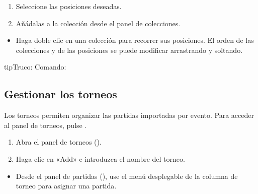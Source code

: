 \documentclass[letterpaper,10pt,spanish]{sphinxmanual}
\begin{document}
\sphinxAtStartPar
{}
\begin{enumerate}
%
\item {} 
\sphinxAtStartPar
Seleccione las posiciones deseadas.

\item {} 
\sphinxAtStartPar
Añádalas a la colección desde el panel de colecciones.

\end{enumerate}

\sphinxAtStartPar
{}
\begin{itemize}
\item {} 
\sphinxAtStartPar
Haga doble clic en una colección para recorrer sus posiciones. El orden de las colecciones y de las posiciones se puede modificar arrastrando y soltando.

\end{itemize}

\begin{sphinxadmonition}{tip}{Truco:}
\sphinxAtStartPar
Comando: 
\end{sphinxadmonition}


\subsection{Gestionar los torneos}
\label{\detokenize{guide_utilisateur:gerer-les-tournois}}
\sphinxAtStartPar
Los torneos permiten organizar las partidas importadas por evento. Para acceder al panel de torneos, pulse .

\sphinxAtStartPar
{}
\begin{enumerate}
%
\item {} 
\sphinxAtStartPar
Abra el panel de torneos ().

\item {} 
\sphinxAtStartPar
Haga clic en «Add» e introduzca el nombre del torneo.

\end{enumerate}

\sphinxAtStartPar
{}
\begin{itemize}
\item {} 
\sphinxAtStartPar
Desde el panel de partidas (), use el menú desplegable de la columna de torneo para asignar una partida.

\end{itemize}
\end{document}
